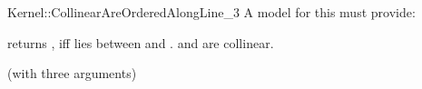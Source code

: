 \begin{ccRefFunctionObjectConcept}{Kernel::CollinearAreOrderedAlongLine_3}
A model for this must provide:


         {returns , iff  lies between  
          and . \ccPrecond {} and  are 
          collinear.}

\ccRefines
{} (with three arguments)

\ccSeeAlso

  \\

\end{ccRefFunctionObjectConcept}

